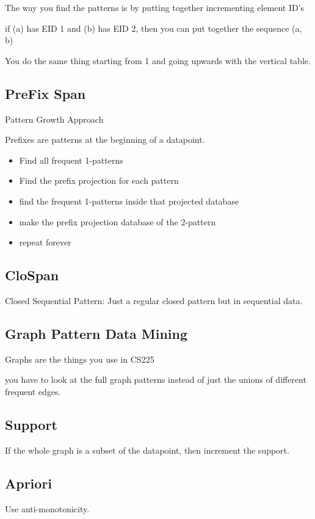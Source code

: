 \documentclass[fleqn]{report}
\begin{document}
The way you find the patterns is by putting together 
incrementing element ID's 

if (a) has EID 1 and (b) has EID 2, then you can
put together the sequence (a, b) 

You do the same thing starting from 1 and going upwards with the vertical 
table. 

\subsection{PreFix Span}
Pattern Growth Approach 

Prefixes are patterns at the beginning of a datapoint. 

\begin{itemize}
    \item 
    Find all frequent 1-patterns
    \item 
    Find the prefix projection for each pattern 
    \item 
    find the frequent 1-patterns inside that projected database 
    \item 
    make the prefix projection database of the 2-pattern 
    \item 
    repeat forever 
\end{itemize}

\subsection{CloSpan}
Closed Sequential Pattern:
Just a regular closed pattern but in sequential data. 

\subsection{Graph Pattern Data Mining}
Graphs are the things you use in CS225 

you have to look at the full graph patterns instead of just 
the unions of different frequent edges. 

\subsection{Support}
If the whole graph is a subset of the datapoint, then 
increment the support.

\subsection{Apriori}
Use anti-monotonicity.
\end{document}
